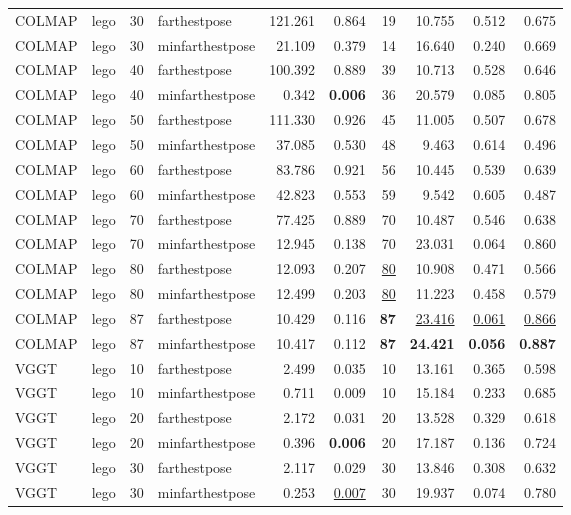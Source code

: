 \begin{table}[H]
\begin{tabular}{llrlrrrrrr}
COLMAP & lego & 30 & farthestpose & 121.261 & 0.864 & 19 & 10.755 & 0.512 & 0.675 \\
COLMAP & lego & 30 & minfarthestpose & 21.109 & 0.379 & 14 & 16.640 & 0.240 & 0.669 \\
COLMAP & lego & 40 & farthestpose & 100.392 & 0.889 & 39 & 10.713 & 0.528 & 0.646 \\
COLMAP & lego & 40 & minfarthestpose & 0.342 & \textbf{0.006} & 36 & 20.579 & 0.085 & 0.805 \\
COLMAP & lego & 50 & farthestpose & 111.330 & 0.926 & 45 & 11.005 & 0.507 & 0.678 \\
COLMAP & lego & 50 & minfarthestpose & 37.085 & 0.530 & 48 & 9.463 & 0.614 & 0.496 \\
COLMAP & lego & 60 & farthestpose & 83.786 & 0.921 & 56 & 10.445 & 0.539 & 0.639 \\
COLMAP & lego & 60 & minfarthestpose & 42.823 & 0.553 & 59 & 9.542 & 0.605 & 0.487 \\
COLMAP & lego & 70 & farthestpose & 77.425 & 0.889 & 70 & 10.487 & 0.546 & 0.638 \\
COLMAP & lego & 70 & minfarthestpose & 12.945 & 0.138 & 70 & 23.031 & 0.064 & 0.860 \\
COLMAP & lego & 80 & farthestpose & 12.093 & 0.207 & \underline{80} & 10.908 & 0.471 & 0.566 \\
COLMAP & lego & 80 & minfarthestpose & 12.499 & 0.203 & \underline{80} & 11.223 & 0.458 & 0.579 \\
COLMAP & lego & 87 & farthestpose & 10.429 & 0.116 & \textbf{87} & \underline{23.416} & \underline{0.061} & \underline{0.866} \\
COLMAP & lego & 87 & minfarthestpose & 10.417 & 0.112 & \textbf{87} & \textbf{24.421} & \textbf{0.056} & \textbf{0.887} \\
VGGT & lego & 10 & farthestpose & 2.499 & 0.035 & 10 & 13.161 & 0.365 & 0.598 \\
VGGT & lego & 10 & minfarthestpose & 0.711 & 0.009 & 10 & 15.184 & 0.233 & 0.685 \\
VGGT & lego & 20 & farthestpose & 2.172 & 0.031 & 20 & 13.528 & 0.329 & 0.618 \\
VGGT & lego & 20 & minfarthestpose & 0.396 & \textbf{0.006} & 20 & 17.187 & 0.136 & 0.724 \\
VGGT & lego & 30 & farthestpose & 2.117 & 0.029 & 30 & 13.846 & 0.308 & 0.632 \\
VGGT & lego & 30 & minfarthestpose & 0.253 & \underline{0.007} & 30 & 19.937 & 0.074 & 0.780 \\

\end{tabular}
\end{table}
